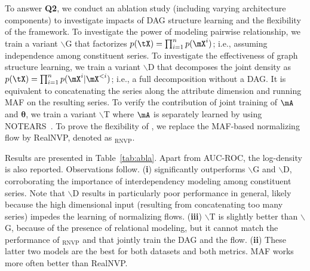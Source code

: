 To answer \textbf{Q2}, we conduct an ablation study (including varying architecture components) to investigate impacts of DAG structure learning and the flexibility of the {\method} framework. To investigate the power of modeling pairwise relationship, we train a variant {\method$\backslash$G} that factorizes $p(\tX)=\prod_{i=1}^n p(\mX^i)$; i.e., assuming independence among constituent series. To investigate the effectiveness of graph structure learning, we train a variant {\method$\backslash$D} that decomposes the joint density as $p(\tX) = \prod_{i=1}^n p(\mX^i|\mX^{<i})$; i.e., a full decomposition without a DAG. It is equivalent to concatenating the series along the attribute dimension and running MAF on the resulting series. To verify the contribution of joint training of $\mA$ and $\bm{\theta}$, we train a variant {\method$\backslash$T} where $\mA$ is separately learned by using NOTEARS~\citep{Zheng2018}. To prove the flexibility of {\method}, we replace the MAF-based normalizing flow by RealNVP, denoted as {\method$_\text{RNVP}$}.

Results are presented in Table~\ref{tab:abla}. Apart from AUC-ROC, the log-density is also reported. Observations follow. (\textbf{i}) {\method} significantly outperforms {\method$\backslash$G} and {\method$\backslash$D}, corroborating the importance of interdependency modeling among constituent series. Note that {\method$\backslash$D} results in particularly poor performance in general, likely because the high dimensional input (resulting from concatenating too many series) impedes the learning of normalizing flows. (\textbf{iii}) {\method$\backslash$T} is slightly better than {\method$\backslash$G}, because of the presence of relational modeling, but it cannot match the performance of {\method$_\text{RNVP}$} and {\method} that jointly train the DAG and the flow. (\textbf{ii}) These latter two models are the best for both datasets and both metrics. MAF works more often better than RealNVP.


